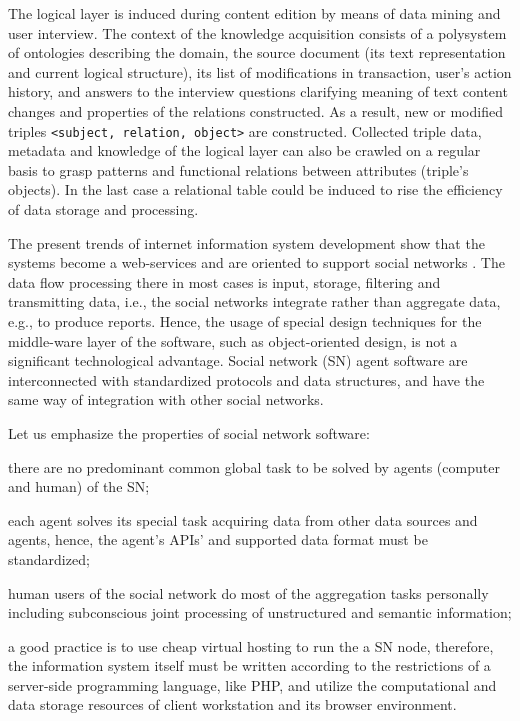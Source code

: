 \documentclass[conference]{IEEEtran}
\begin{document}
The logical layer is induced during content edition by means of data
mining and user interview.  The context of the knowledge acquisition
consists of a polysystem \cite{father} of ontologies describing the
domain, the source document (its text representation and current
logical structure), its list of modifications in transaction, user's
action history, and answers to the interview questions clarifying
meaning of text content changes and properties of the relations
constructed.  As a result, new or modified triples \texttt{<subject,
  relation, object>} are constructed.
Collected triple data, metadata and knowledge of the logical layer can
also be crawled on a regular basis to grasp patterns and
functional relations between attributes (triple's objects).  In the
last case a relational table could be induced to rise the efficiency
of data storage and processing.

The present trends of internet information system development show
that the systems become a web-services and are oriented to support
social networks \cite{SN}.  The data flow processing there in most
cases is input, storage, filtering and transmitting data, i.e., the
social networks integrate rather than aggregate data, e.g., to produce
reports.  Hence, the usage of special design techniques for the
middle-ware layer of the software, such as object-oriented design, is
not a significant technological advantage.  Social network (SN) agent software are
interconnected with standardized protocols and data structures, and
have the same way of integration with other social networks.

Let us emphasize the properties of social network software:
\begin{IEEEitemize}[\IEEEsetlabelwidth{Z}]
\item there are no predominant common global task to be solved by
  agents (computer and human) of the SN;
\item each agent solves its special task acquiring data from other
  data sources and agents, hence, the agent's APIs’ and
  supported data format must be standardized;
\item human users of the social network do most of the aggregation
  tasks personally including subconscious joint processing of
  unstructured and semantic information;
\item a good practice is to use cheap virtual hosting to run the
  a SN node, therefore, the information system itself must be written
  according to the restrictions of a server-side programming language,
  like PHP, and utilize the computational and data storage resources
  of client workstation and its browser environment.
\end{IEEEitemize}
\end{document}
